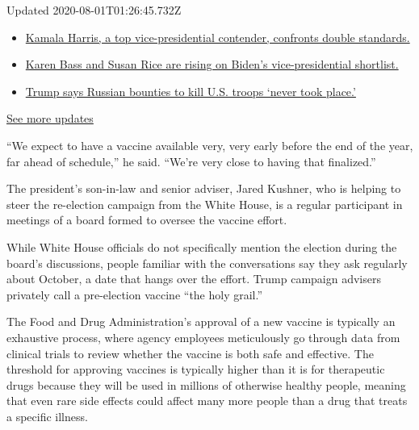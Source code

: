 Updated 2020-08-01T01:26:45.732Z

\begin{itemize}
\tightlist
\item
  \href{https://www.nytimes.com/2020/07/31/us/elections/biden-vs-trump.html?action=click\&pgtype=Article\&state=default\&region=MAIN_CONTENT_1\&context=storylines_live_updates\#link-29fdff45}{Kamala
  Harris, a top vice-presidential contender, confronts double
  standards.}
\item
  \href{https://www.nytimes.com/2020/07/31/us/elections/biden-vs-trump.html?action=click\&pgtype=Article\&state=default\&region=MAIN_CONTENT_1\&context=storylines_live_updates\#link-13ec3d9c}{Karen
  Bass and Susan Rice are rising on Biden's vice-presidential
  shortlist.}
\item
  \href{https://www.nytimes.com/2020/07/31/us/elections/biden-vs-trump.html?action=click\&pgtype=Article\&state=default\&region=MAIN_CONTENT_1\&context=storylines_live_updates\#link-49e9a016}{Trump
  says Russian bounties to kill U.S. troops `never took place.'}
\end{itemize}

\href{https://www.nytimes.com/2020/07/31/us/elections/biden-vs-trump.html?action=click\&pgtype=Article\&state=default\&region=MAIN_CONTENT_1\&context=storylines_live_updates}{See
more updates}

``We expect to have a vaccine available very, very early before the end
of the year, far ahead of schedule,'' he said. ``We're very close to
having that finalized.''

The president's son-in-law and senior adviser, Jared Kushner, who is
helping to steer the re-election campaign from the White House, is a
regular participant in meetings of a board formed to oversee the vaccine
effort.

While White House officials do not specifically mention the election
during the board's discussions, people familiar with the conversations
say they ask regularly about October, a date that hangs over the effort.
Trump campaign advisers privately call a pre-election vaccine ``the holy
grail.''

The Food and Drug Administration's approval of a new vaccine is
typically an exhaustive process, where agency employees meticulously go
through data from clinical trials to review whether the vaccine is both
safe and effective. The threshold for approving vaccines is typically
higher than it is for therapeutic drugs because they will be used in
millions of otherwise healthy people, meaning that even rare side
effects could affect many more people than a drug that treats a specific
illness.

